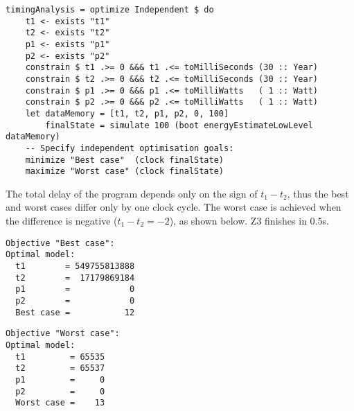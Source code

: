\begin{verbatim}
timingAnalysis = optimize Independent $ do
    t1 <- exists "t1"
    t2 <- exists "t2"
    p1 <- exists "p1"
    p2 <- exists "p2"
    constrain $ t1 .>= 0 &&& t1 .<= toMilliSeconds (30 :: Year)
    constrain $ t2 .>= 0 &&& t2 .<= toMilliSeconds (30 :: Year)
    constrain $ p1 .>= 0 &&& p1 .<= toMilliWatts   ( 1 :: Watt)
    constrain $ p2 .>= 0 &&& p2 .<= toMilliWatts   ( 1 :: Watt)
    let dataMemory = [t1, t2, p1, p2, 0, 100]
        finalState = simulate 100 (boot energyEstimateLowLevel dataMemory)
    -- Specify independent optimisation goals:
    minimize "Best case"  (clock finalState)
    maximize "Worst case" (clock finalState)
\end{verbatim}


\noindent
The total delay of the program depends only on the sign of $t_1 - t_2$, thus
the best and worst cases differ only by one clock cycle. The worst case is
achieved when the difference is negative ($t_1 - t_2 = -2$), as shown below.
Z3 finishes in 0.5s.


\begin{minipage}{0.45\textwidth}
\begin{verbatim}
Objective "Best case":
Optimal model:
  t1        = 549755813888
  t2        =  17179869184
  p1        =            0
  p2        =            0
  Best case =           12
\end{verbatim}
\end{minipage}
\begin{minipage}{0.45\textwidth}
\begin{verbatim}
Objective "Worst case":
Optimal model:
  t1         = 65535
  t2         = 65537
  p1         =     0
  p2         =     0
  Worst case =    13
\end{verbatim}
\end{minipage}



